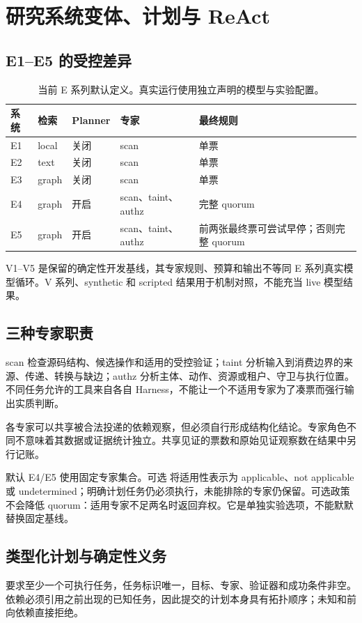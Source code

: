 \section{研究系统变体、计划与 ReAct}
\subsection{E1--E5 的受控差异}
\begin{table}[htbp]
\centering\small
\begin{tabularx}{\textwidth}{L{12mm}L{23mm}L{18mm}L{42mm}Y}
\toprule 系统 & 检索 & Planner & 专家 & 最终规则\\\midrule
E1 & local & 关闭 & scan & 单票\\
E2 & text & 关闭 & scan & 单票\\
E3 & graph & 关闭 & scan & 单票\\
E4 & graph & 开启 & scan、taint、authz & 完整 quorum\\
E5 & graph & 开启 & scan、taint、authz & 前两张最终票可尝试早停；否则完整 quorum\\
\bottomrule
\end{tabularx}
\caption{当前 E 系列默认定义。真实运行使用独立声明的模型与实验配置。}
\end{table}

V1--V5 是保留的确定性开发基线，其专家规则、预算和输出不等同 E 系列真实模型循环。V 系列、synthetic 和 scripted 结果用于机制对照，不能充当 live 模型结果。

\subsection{三种专家职责}
scan 检查源码结构、候选操作和适用的受控验证；taint 分析输入到消费边界的来源、传递、转换与缺边；authz 分析主体、动作、资源或租户、守卫与执行位置。不同任务允许的工具来自各自 Harness，不能让一个不适用专家为了凑票而强行输出实质判断。

各专家可以共享被合法投递的依赖观察，但必须自行形成结构化结论。专家角色不同不意味着其数据或证据统计独立。共享见证的票数和原始见证观察数在结果中另行记账。

默认 E4/E5 使用固定专家集合。可选  将适用性表示为 applicable、not applicable 或 undetermined；明确计划任务仍必须执行，未能排除的专家仍保留。可选政策不会降低 quorum：适用专家不足两名时返回弃权。它是单独实验选项，不能默默替换固定基线。

\subsection{类型化计划与确定性义务}
 要求至少一个可执行任务，任务标识唯一，目标、专家、验证器和成功条件非空。依赖必须引用之前出现的已知任务，因此提交的计划本身具有拓扑顺序；未知和前向依赖直接拒绝。

